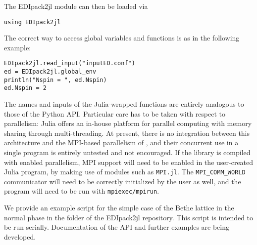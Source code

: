 \documentclass[edipack_sp.tex]{subfiles}
\begin{document}
The EDIpack2jl module can then be loaded via
\begin{lstlisting}[style=myjulia]
using EDIpack2jl
\end{lstlisting}
%
The correct way to access global variables and functions is as in the following example:
\begin{lstlisting}[style=myjulia]
EDIpack2jl.read_input("inputED.conf")
ed = EDIpack2jl.global_env
println("Nspin = ", ed.Nspin)
ed.Nspin = 2
\end{lstlisting}

The names and inputs of the Julia-wrapped functions are entirely analogous to those of the Python API.
Particular care has to be taken with respect to parallelism: Julia offers an in-house platform for parallel computing with memory sharing through multi-threading. At present, there is no integration between this architecture and the MPI-based parallelism of \NAME{}, and their concurrent use in a single program is entirely untested and not encouraged. If the \NAME{} library is compiled with enabled parallelism, MPI support will need to be enabled in the user-created Julia program, by making use of modules such as {\tt  MPI.jl}. The {\tt MPI\_COMM\_WORLD} communicator will need to be correctly initialized by the user as well, and the program will need to be run with {\tt  mpiexec/mpirun}.

We provide an example script for the simple case of the Bethe lattice in the normal phase in the  folder of the EDIpack2jl repository. This script is intended to be run serially. Documentation of the API and further examples are being developed.



\ifSubfilesClassLoaded{
  
}{}
\end{document}
